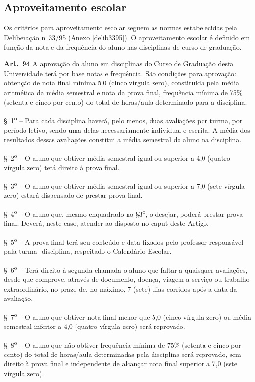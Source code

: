 \subsection{Aproveitamento escolar}
Os critérios para aproveitamento escolar seguem as normas estabelecidas pela Deliberação n\textordmasculine~33/95 (Anexo \ref{delib3395}). O aproveitamento escolar é definido em função da nota e da frequência do aluno nas disciplinas do curso de graduação.
\begin{itquotation}

  \textbf{Art.~94} A aprovação do aluno em disciplinas do Curso de Graduação desta Universidade terá por base notas e frequência. São condições para aprovação: obtenção de nota final mínima 5,0 (cinco vírgula zero), constituída pela média aritmética da média semestral e nota da prova final, frequência mínima de 75\% (setenta e cinco por cento) do total de horas/aula determinado para a disciplina.

  \S~1\textsuperscript{o} -- Para cada disciplina haverá, pelo menos, duas avaliações por turma, por período letivo, sendo uma delas necessariamente individual e escrita. A média dos resultados dessas avaliações constitui a média semestral do aluno na disciplina.

  \S~2\textsuperscript{o} -- O aluno que obtiver média semestral igual ou superior a 4,0 (quatro vírgula zero) terá direito à prova final.

  \S~3\textsuperscript{o} -- O aluno que obtiver média semestral igual ou superior a 7,0 (sete vírgula zero) estará dispensado de prestar prova final.

  \S~4\textsuperscript{o} -- O aluno que, mesmo enquadrado no \S 3\textsuperscript{o}, o desejar, poderá prestar prova final. Deverá, neste caso, atender ao disposto no caput deste Artigo.

  \S~5\textsuperscript{o} -- A prova final terá seu conteúdo e data fixados pelo professor responsável pala turma-
  disciplina, respeitado o Calendário Escolar.

  \S~6\textsuperscript{o} -- Terá direito à segunda chamada o aluno que faltar a quaisquer avaliações, desde que
  comprove, através de documento, doença, viagem a serviço ou trabalho extraordinário, no prazo de,
  no máximo, 7 (sete) dias corridos após a data da avaliação.

  \S~7\textsuperscript{o} -- O aluno que obtiver nota final menor que 5,0 (cinco vírgula zero) ou média semestral inferior a 4,0 (quatro vírgula zero) será reprovado.

  \S~8\textsuperscript{o} -- O aluno que não obtiver frequência mínima de 75\% (setenta e cinco por cento) do total de horas/aula determinadas pela disciplina será reprovado, sem direito à prova final e independente de alcançar nota final superior a 7,0 (sete vírgula zero).
\end{itquotation}


